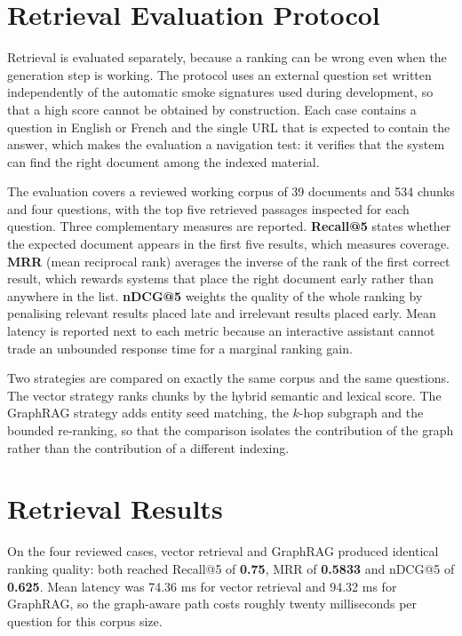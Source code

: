 \section{Retrieval Evaluation Protocol}
\label{sec:retrieval-protocol}
Retrieval is evaluated separately, because a ranking can be wrong even when the generation step is working. The protocol uses an external question set written independently of the automatic smoke signatures used during development, so that a high score cannot be obtained by construction. Each case contains a question in English or French and the single URL that is expected to contain the answer, which makes the evaluation a navigation test: it verifies that the system can find the right document among the indexed material.

The evaluation covers a reviewed working corpus of 39 documents and 534 chunks and four questions, with the top five retrieved passages inspected for each question. Three complementary measures are reported. \textbf{Recall@5} states whether the expected document appears in the first five results, which measures coverage. \textbf{MRR} (mean reciprocal rank) averages the inverse of the rank of the first correct result, which rewards systems that place the right document early rather than anywhere in the list. \textbf{nDCG@5} weights the quality of the whole ranking by penalising relevant results placed late and irrelevant results placed early. Mean latency is reported next to each metric because an interactive assistant cannot trade an unbounded response time for a marginal ranking gain.

Two strategies are compared on exactly the same corpus and the same questions. The vector strategy ranks chunks by the hybrid semantic and lexical score. The GraphRAG strategy adds entity seed matching, the $k$-hop subgraph and the bounded re-ranking, so that the comparison isolates the contribution of the graph rather than the contribution of a different indexing.

\section{Retrieval Results}
\label{sec:retrieval-results}
On the four reviewed cases, vector retrieval and GraphRAG produced identical ranking quality: both reached Recall@5 of \textbf{0.75}, MRR of \textbf{0.5833} and nDCG@5 of \textbf{0.625}. Mean latency was 74.36 ms for vector retrieval and 94.32 ms for GraphRAG, so the graph-aware path costs roughly twenty milliseconds per question for this corpus size.

